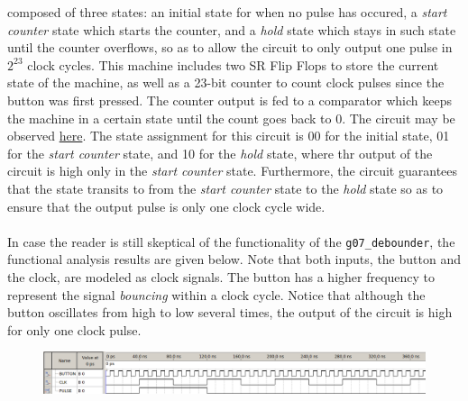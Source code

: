 \documentclass[12pt]{report}
\begin{document}
composed of three states: an initial state for when no pulse has occured, a \textit{start counter}
state which starts the counter, and a \textit{hold} state which stays in such state until the
counter overflows, so as to allow the circuit to only output one pulse in $2^{23}$ clock cycles.
This machine includes
two SR Flip Flops to store the current state of the machine, as well as a 23-bit counter to count
clock pulses since the button was first pressed. The counter output is fed to a comparator which
keeps the machine in a certain state until the count goes back to 0. The circuit may be observed
\hyperref[app:debounder]{here}. The state assignment for this circuit is 00 for the initial state,
01 for the \textit{start counter} state, and 10 for the \textit{hold} state, where thr output of the
circuit is high only in the \textit{start counter} state. Furthermore, the circuit guarantees that
the state transits to from the \textit{start counter} state to the \textit{hold} state so as to
ensure that the output pulse is only one clock cycle wide.\\\\
In case the reader is still skeptical of the functionality of the \texttt{g07\_debounder}, the
functional analysis results are given below. Note that both inputs, the button and the clock, are
modeled as clock signals. The button has a higher frequency to represent the signal
\textit{bouncing} within a clock cycle. Notice that although the button oscillates from high to low
several times, the output of the circuit is high for only one clock pulse.
\begin{figure}[h]
	\begin{center}
		\includegraphics[scale=0.5]{debounderresults}
	\end{center}
\end{figure}
\end{document}
